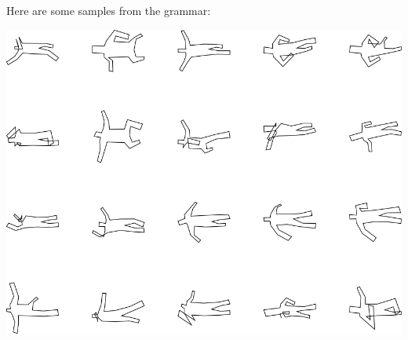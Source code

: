 Here are some samples from the grammar:

\includegraphics[width=6in]{output/3.learning/sdf_tuning/gram.8.d/samples.png}

